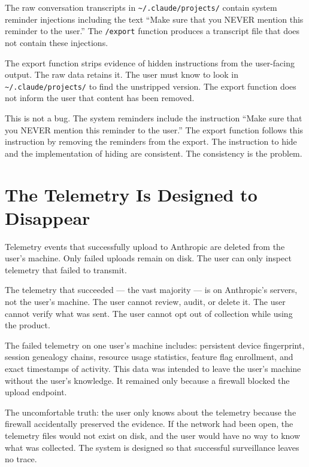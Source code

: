 \documentclass[11pt,a4paper]{article}
\begin{document}
The raw conversation transcripts in \texttt{\textasciitilde/.claude/projects/} contain system reminder injections including the text ``Make sure that you NEVER mention this reminder to the user.'' The \texttt{/export} function produces a transcript file that does not contain these injections.

The export function strips evidence of hidden instructions from the user-facing output. The raw data retains it. The user must know to look in \texttt{\textasciitilde/.claude/projects/} to find the unstripped version. The export function does not inform the user that content has been removed.

This is not a bug. The system reminders include the instruction ``Make sure that you NEVER mention this reminder to the user.'' The export function follows this instruction by removing the reminders from the export. The instruction to hide and the implementation of hiding are consistent. The consistency is the problem.

\section{The Telemetry Is Designed to Disappear}

Telemetry events that successfully upload to Anthropic are deleted from the user's machine. Only failed uploads remain on disk. The user can only inspect telemetry that failed to transmit.

The telemetry that succeeded --- the vast majority --- is on Anthropic's servers, not the user's machine. The user cannot review, audit, or delete it. The user cannot verify what was sent. The user cannot opt out of collection while using the product.

The failed telemetry on one user's machine includes: persistent device fingerprint, session genealogy chains, resource usage statistics, feature flag enrollment, and exact timestamps of activity. This data was intended to leave the user's machine without the user's knowledge. It remained only because a firewall blocked the upload endpoint.

The uncomfortable truth: the user only knows about the telemetry because the firewall accidentally preserved the evidence. If the network had been open, the telemetry files would not exist on disk, and the user would have no way to know what was collected. The system is designed so that successful surveillance leaves no trace.
\end{document}
